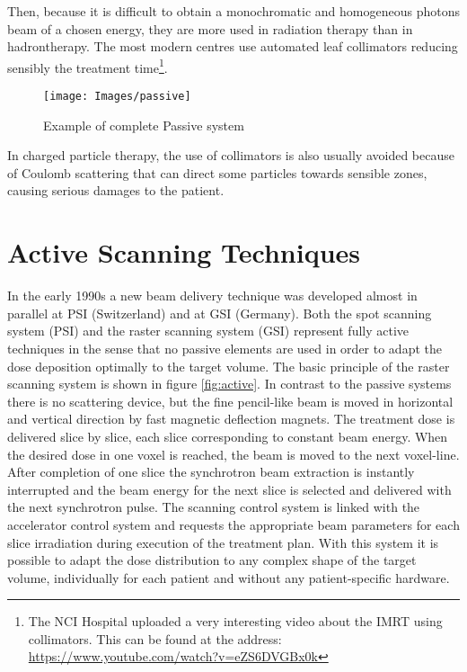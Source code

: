 \documentclass[12pt, a4paper, twoside]{book}
\begin{document}
Then, because it is difficult to obtain a monochromatic and homogeneous photons beam of a chosen energy, they are more used in radiation therapy than in hadrontherapy.
The most modern centres use automated leaf collimators reducing sensibly the treatment time\footnote{The NCI Hospital uploaded a very interesting video about the IMRT using collimators. This can be found at the address: \url{https://www.youtube.com/watch?v=eZS6DVGBx0k}}. 
\begin{figure}[t]
{\texttt{[image: Images/passive]}}
\caption{Example of complete Passive system}
\label{fig:passive}
\end{figure}

In charged particle therapy, the use of collimators is also usually avoided because of Coulomb scattering that can direct some particles towards sensible zones, causing serious damages to the patient.

\section{Active Scanning Techniques}
\label{activeScanning}
In the early 1990s a new beam delivery technique was developed almost in parallel at PSI (Switzerland) and at GSI (Germany). Both the spot scanning system (PSI) and the raster scanning system (GSI) represent fully active techniques in the sense that no passive elements are used in order to adapt the dose deposition optimally to the target volume. The basic principle of the raster scanning system is shown in figure \ref{fig:active}.
In contrast to the passive systems there is no scattering device, but the fine pencil-like beam is moved in horizontal and vertical direction by fast magnetic deflection magnets. The treatment dose is delivered slice by slice, each slice corresponding to constant beam energy.
When the desired dose in one voxel is reached, the beam is moved to the next voxel-line. After completion of one slice the synchrotron beam extraction is instantly interrupted and the beam energy for the next slice is selected and delivered with the next synchrotron pulse. The scanning control system is linked with the accelerator control system and requests the appropriate beam parameters for each slice irradiation during execution of the treatment plan. 
With this system it is possible to adapt the dose distribution to any complex shape of the target volume, individually for each patient and without any patient-specific hardware.
\end{document}
